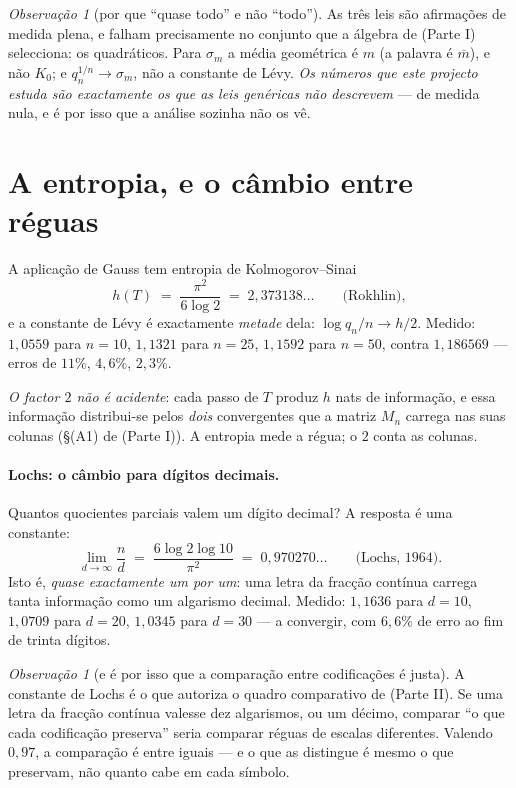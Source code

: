 \documentclass[11pt,a4paper]{article}
\theoremstyle{plain}
\theoremstyle{definition}
\theoremstyle{remark}
\newtheorem{obs}[teorema]{Observação}
\begin{document}
\begin{obs}[por que ``quase todo'' e não ``todo'']\label{obs:quasetodo}
As três leis são afirmações de medida plena, e falham precisamente no conjunto que a álgebra de (Parte I)
selecciona: os quadráticos. Para $\sigma_m$ a média geométrica é $m$ (a palavra é $\overline m$), e
não $K_0$; e $q_n^{1/n}\to\sigma_m$, não a constante de Lévy. \emph{Os números que este projecto
estuda são exactamente os que as leis genéricas não descrevem} --- de medida nula, e é por isso que
a análise sozinha não os vê.
\end{obs}

\section{A entropia, e o câmbio entre réguas}\label{sec:entropia}

A aplicação de Gauss tem entropia de Kolmogorov--Sinai
\[
  h(T) \;=\; \frac{\pi^2}{6\log 2} \;=\; 2{,}373138\ldots \qquad\text{(Rokhlin)},
\]
e a constante de Lévy é exactamente \emph{metade} dela: $\log q_n/n \to h/2$. Medido:
$1{,}0559$ para $n=10$, $1{,}1321$ para $n=25$, $1{,}1592$ para $n=50$, contra $1{,}186569$
--- erros de $11\%$, $4{,}6\%$, $2{,}3\%$.

\emph{O factor $2$ não é acidente}: cada passo de $T$ produz $h$ nats de informação, e essa
informação distribui-se pelos \emph{dois} convergentes que a matriz $M_n$ carrega nas suas colunas
(\S(A1) de (Parte I)). A entropia mede a régua; o $2$ conta as colunas.

\paragraph{Lochs: o câmbio para dígitos decimais.} Quantos quocientes parciais valem um dígito
decimal? A resposta é uma constante:
\[
  \lim_{d\to\infty}\frac{n}{d} \;=\; \frac{6\log2\log10}{\pi^2} \;=\; 0{,}970270\ldots
  \qquad\text{(Lochs, 1964)}.
\]
Isto é, \emph{quase exactamente um por um}: uma letra da fracção contínua carrega tanta informação
como um algarismo decimal. Medido: $1{,}1636$ para $d=10$, $1{,}0709$ para $d=20$, $1{,}0345$ para
$d=30$ --- a convergir, com $6{,}6\%$ de erro ao fim de trinta dígitos.

\begin{obs}[e é por isso que a comparação entre codificações é justa]\label{obs:lochs}
A constante de Lochs é o que autoriza o quadro comparativo de (Parte II). Se uma letra da fracção contínua
valesse dez algarismos, ou um décimo, comparar ``o que cada codificação preserva'' seria comparar
réguas de escalas diferentes. Valendo $0{,}97$, a comparação é entre iguais --- e o que as distingue
é mesmo o que preservam, não quanto cabe em cada símbolo.
\end{obs}
\end{document}
